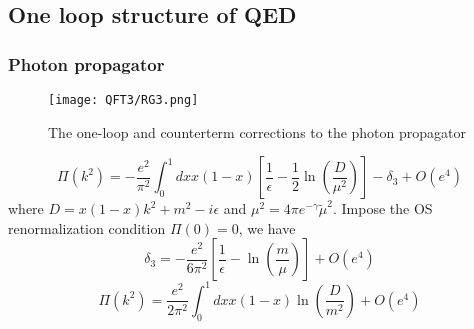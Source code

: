 \subsection{One loop structure of QED}
\subsubsection{Photon propagator}
\begin{figure}[!h]
\centering
\texttt{[image: QFT3/RG3.png]}
\caption{The one-loop and counterterm corrections to the photon propagator}
\end{figure}
\[\Pi(k^2) = -\frac{e^2}{\pi^2} \int_0^1 dx x(1-x) \left[ \frac{1}{\epsilon} - \frac{1}{2}\ln(\frac{D}{\mu^2})\right] - \delta_3 + O(e^4)\]
where $D = x(1-x)k^2+m^2-i\epsilon$ and $\mu^2 = 4\pi e^{-\gamma} \tilde{\mu}^2$.
Impose the OS renormalization condition $\Pi(0) = 0$, we have
\[\delta_3 = -\frac{e^2}{6\pi^2} \left[ \frac{1}{\epsilon} - \ln(\frac{m}{\mu})\right] + O(e^4)\]
\[\Pi(k^2) = \frac{e^2}{2\pi^2} \int_0^1 dx x(1-x) \ln(\frac{D}{m^2}) + O(e^4)\]

